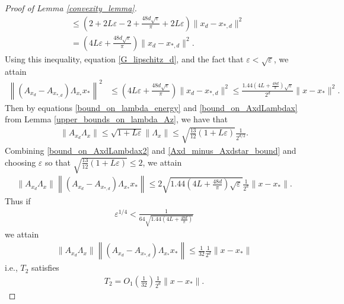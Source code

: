 \documentclass[11pt]{article}
\renewcommand{\epsilon}{\varepsilon}
\theoremstyle{remark}
\begin{document}
\begin{proof}[Proof of Lemma \ref{convexity_lemma}]
\begin{align*}
    & \leqslant \left(2 + 2L\epsilon -2 +\frac{48d\sqrt{\epsilon}}{\pi}+ 2L\epsilon\right)\|x_d - x_{*,d}\|^2 \\
    & = \left(4L\epsilon + \frac{48d\sqrt{\epsilon}}{\pi}\right)\|x_d - x_{*,d}\|^2.
\end{align*} Using this inequality, equation \eqref{G_lipschitz_d}, and the fact that $\epsilon < \sqrt{\epsilon}$, we attain \begin{align}
    \left\|(A_{x_d} - A_{x_{*,d}})\Lambda_{x_*}x_*\right\|^2 & \leqslant \left(4L\epsilon + \frac{48d\sqrt{\epsilon}}{\pi}\right)\|x_d - x_{*,d}\|^2 \leqslant \frac{1.44(4L + \frac{48d}{\pi})\sqrt{\epsilon}}{2^d}\|x - x_*\|^2. \label{Axd_minus_Axdstar_bound}
\end{align} Then by equations \eqref{bound_on_lambda_energy} and \eqref{bound_on_AxdLambdax} from Lemma \ref{upper_bounds_on_lambda_Az}, we have that \begin{align}
    \|A_{x_d}\Lambda_x\| \leqslant \sqrt{1 + L\epsilon}\|\Lambda_x\| \leqslant \sqrt{\frac{13}{12}(1+ L\epsilon)}\frac{1}{2^{d/2}}. \label{bound_on_AxdLambdax2}
\end{align} Combining \eqref{bound_on_AxdLambdax2} and \eqref{Axd_minus_Axdstar_bound} and choosing $\epsilon$ so that $\sqrt{\frac{13}{12}(1+ L\epsilon)} \leqslant 2$, we attain \begin{align*}
    \|A_{x_d}\Lambda_x\|\left\|(A_{x_d} - A_{x_{*,d}})\Lambda_{x_*}x_*\right\| \leqslant 2 \sqrt{1.44\left(4L + \frac{48d}{\pi}\right)\sqrt{\epsilon}}\frac{1}{2^d}\|x-x_*\|.
\end{align*} Thus if \begin{align*}
    \epsilon^{1/4} < \frac{1}{64\sqrt{1.44\left(4L + \frac{48d}{\pi}\right)}}
\end{align*} we attain \begin{align*}
    \|A_{x_d}\Lambda_x\|\left\|(A_{x_d} - A_{x_{*,d}})\Lambda_{x_*}x_*\right\| \leqslant \frac{1}{32}\frac{1}{2^d}\|x-x_*\| \end{align*} i.e., $T_2$ satisfies
    \begin{align}
     T_2 = O_1\left(\frac{1}{32}\right)\frac{1}{2^d}\|x-x_*\|. \label{T2_bound}
\end{align} 


\end{proof}
\end{document}
